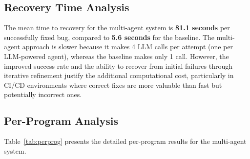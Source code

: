 \documentclass[conference]{IEEEtran}
\begin{document}
\subsection{Recovery Time Analysis}
The mean time to recovery for the multi-agent system is \textbf{81.1 seconds} per successfully fixed bug, compared to \textbf{5.6 seconds} for the baseline. The multi-agent approach is slower because it makes 4 LLM calls per attempt (one per LLM-powered agent), whereas the baseline makes only 1 call. However, the improved success rate and the ability to recover from initial failures through iterative refinement justify the additional computational cost, particularly in CI/CD environments where correct fixes are more valuable than fast but potentially incorrect ones.

\subsection{Per-Program Analysis}
Table~\ref{tab:perprog} presents the detailed per-program results for the multi-agent system.
\end{document}
